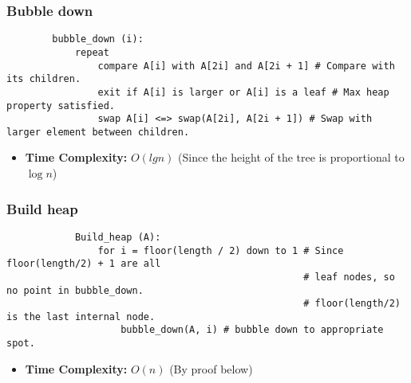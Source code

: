     \subsubsection{Bubble down}
    \begin{definition}
        \begin{lstlisting}
        bubble_down (i):
            repeat
                compare A[i] with A[2i] and A[2i + 1] # Compare with its children.
                exit if A[i] is larger or A[i] is a leaf # Max heap property satisfied.
                swap A[i] <=> swap(A[2i], A[2i + 1]) # Swap with larger element between children.
        \end{lstlisting}
        \begin{itemize}
            \item \textbf{Time Complexity:} $O(lg n)$ (Since the height of the tree is proportional to $\log n$)
        \end{itemize}

    \end{definition}

    \subsubsection{Build heap}
    \begin{definition}
        \begin{lstlisting}
            Build_heap (A):
                for i = floor(length / 2) down to 1 # Since floor(length/2) + 1 are all
                                                    # leaf nodes, so no point in bubble_down.
                                                    # floor(length/2) is the last internal node.
                    bubble_down(A, i) # bubble down to appropriate spot.
        \end{lstlisting}
        \begin{itemize}
            \item \textbf{Time Complexity:} $O(n)$ (By proof below)
        \end{itemize}


    \end{definition}

